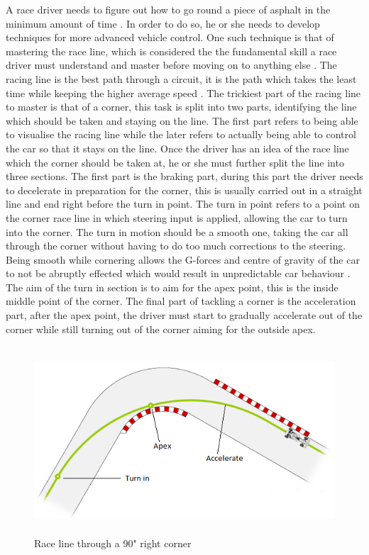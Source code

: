 A race driver needs to figure out how to go round a piece of asphalt in the minimum amount of time \cite{GoingFaster}. In order to do so, he or she needs to develop techniques for more advanced vehicle control. One such technique is that of mastering the race line, which is considered the the fundamental skill a race driver must understand and master before moving on to anything else \cite{GoingFaster}. The racing line is the best path through a circuit, it is the path which takes the least time while keeping the higher average speed \cite{beckman1991physics}. The trickiest part of the racing line to master is that of a corner, this task is  split into two parts, identifying the line which should be taken and staying on the line. The first part refers to being able to visualise the racing line while the later refers to actually being able to control the car so that it stays on the line. Once the driver has an idea of the race line which the corner should be taken at, he or she must further split the line into three sections. The first part is the braking part, during this part the driver needs to decelerate in preparation for the corner, this is usually carried out in a straight line and end right before the turn in point. The turn in point refers to a point on the corner race line in which steering input is applied, allowing the car to turn into the corner. The turn in motion should be a smooth one, taking the car all through the corner without having to do too much corrections to the steering. Being smooth while cornering allows the G-forces and centre of gravity of the car to not be abruptly effected which would result in unpredictable car behaviour \cite{GoingFaster}. The aim of the turn in section is to aim for the apex point, this is the inside middle point of the corner. The final part of tackling a corner is the acceleration part, after the apex point, the driver must start to gradually accelerate out of the corner while still turning out of the corner aiming for the outside apex.

\begin{figure}[!htb]
	\centering
	\includegraphics[height=7cm]{images/cornerraceline}
	\caption{Race line through a 90" right corner}
	\label{fig:CornerRaceLine}
\end{figure}


